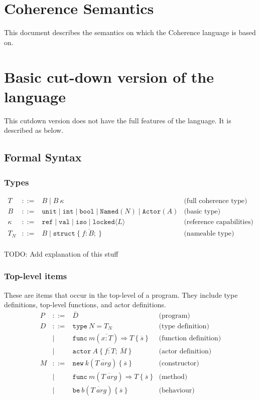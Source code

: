 \documentclass[a4paper,12pt,fleqn]{article}
\begin{document}
\section{Coherence Semantics}
This document describes the semantics on which the Coherence language is based on.

\section{Basic cut-down version of the language}
This cutdown version does not have the full features of the language. It is described as below.

\subsection{Formal Syntax}

\subsubsection{Types}
\[
\begin{array}{lcll}
T & ::= & B \mid B\ \kappa & \text{(full coherence type)} \\[0.5em]
B & ::= & \mathtt{unit} \mid \mathtt{int} \mid \mathtt{bool} \mid \mathtt{Named}(N) \mid \mathtt{Actor}(A) & \text{(basic type)} \\[0.5em]
\kappa & ::= & \mathtt{ref} \mid \mathtt{val} \mid \mathtt{iso} \mid \mathtt{locked}\langle L \rangle & \text{(reference capabilities)} \\[0.5em]
T_N & ::= & B  \mid \mathtt{struct}\ \{\ \overline{f : B;}\ \} & \text{(nameable type)}
\end{array}
\]
\\
TODO: Add explanation of this stuff
\\
\subsubsection{Top-level items}
These are items that occur in the top-level of a program. They include type definitions, top-level functions, and actor definitions.
\[
\begin{array}{lcll}
P & ::= & \overline{D} & \text{(program)} \\[0.5em]
D & ::= & \mathtt{type}\ N = T_N & \text{(type definition)} \\
  & \mid & \mathtt{func}\ m(\overline{x : T}) \Rightarrow T\ \{\ \overline{s}\ \} & \text{(function definition)} \\
  & \mid & \mathtt{actor}\ A\ \{\ \overline{f : T};\ \overline{M}\ \} & \text{(actor definition)} \\[0.5em]
M & ::= & \mathtt{new}\ k(\overline{T\ \mathit{arg}})\ \{\ \overline{s}\ \} & \text{(constructor)} \\
  & \mid & \mathtt{func}\ m(\overline{T\ \mathit{arg}}) \Rightarrow T\ \{\ \overline{s}\ \} & \text{(method)} \\
  & \mid & \mathtt{be}\ b(\overline{T\ \mathit{arg}})\ \{\ \overline{s}\ \} & \text{(behaviour)}
\end{array}
\]
\end{document}
